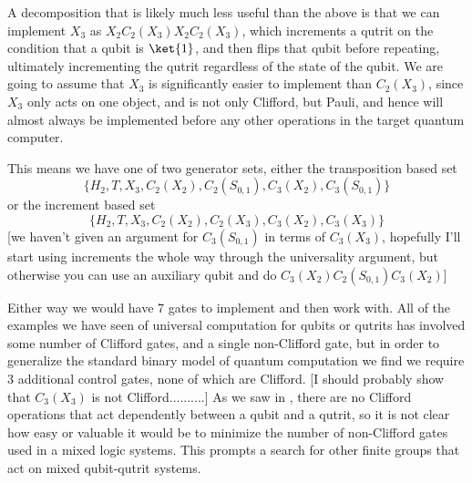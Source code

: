 A decomposition that is likely much less useful than the above is that we can implement $X_3$ as $X_2C_2(X_3)X_2C_2(X_3)$, which increments a qutrit on the condition that a qubit is $\ket{1}$, and then flips that qubit before repeating, ultimately incrementing the qutrit regardless of the state of the qubit. We are going to assume that $X_3$ is significantly easier to implement than $C_2(X_3)$, since $X_3$ only acts on one object, and is not only Clifford, but Pauli, and hence will almost always be implemented before any other operations in the target quantum computer.

This means we have one of two generator sets, either the transposition based set
\[\{H_2, T, X_3, C_2(X_2), C_2(S_{0, 1}), C_3(X_2), C_3(S_{0, 1})\}\]
or the increment based set
\[\{H_2, T, X_3, C_2(X_2), C_2(X_3), C_3(X_2), C_3(X_3)\}\]
[we haven't given an argument for $C_3(S_{0,1})$ in terms of $C_3(X_3)$, hopefully I'll start using increments the whole way through the universality argument, but otherwise you can use an auxiliary qubit and do $C_3(X_2)C_2(S_{0,1})C_3(X_2)$]

Either way we would have 7 gates to implement and then work with. All of the examples we have seen of universal computation for qubits or qutrits has involved some number of Clifford gates, and a single non-Clifford gate, but in order to generalize the standard binary model of quantum computation we find we require 3 additional control gates, none of which are Clifford. [I should probably show that $C_3(X_3)$ is not Clifford..........] As we saw in \cite{tolar-clifford}, there are no Clifford operations that act dependently between a qubit and a qutrit, so it is not clear how easy or valuable it would be to minimize the number of non-Clifford gates used in a mixed logic systems. This prompts a search for other finite groups that act on mixed qubit-qutrit systems.

